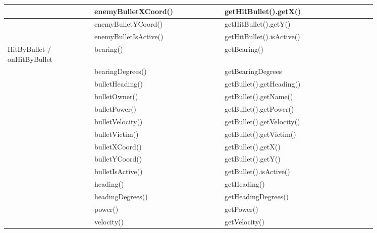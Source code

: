 \begin{center}
\begin{tabular}{ | p{0.2\linewidth} | p{0.3\linewidth} | p{0.35\linewidth} |}
		& enemyBulletXCoord() & getHitBullet().getX() \\ \hline
		& enemyBulletYCoord() & getHitBullet().getY() \\ \hline
		& enemyBulletIsActive() & getHitBullet().isActive() \\ \hline
		HitByBullet / onHitByBullet& bearing() & getBearing() \\ \hline
		& bearingDegrees() & getBearingDegrees \\ \hline
		& bulletHeading() & getBullet().getHeading() \\ \hline
		& bulletOwner() & getBullet().getName() \\ \hline
		& bulletPower() & getBullet().getPower() \\ \hline
		& bulletVelocity() & getBullet().getVelocity() \\ \hline
		& bulletVictim() & getBullet().getVictim() \\ \hline
		& bulletXCoord() & getBullet().getX() \\ \hline
		& bulletYCoord() & getBullet().getY() \\ \hline
		& bulletIsActive() & getBullet().isActive() \\ \hline
		& heading() & getHeading() \\ \hline
		& headingDegrees() & getHeadingDegrees() \\ \hline
		& power() & getPower() \\ \hline
		& velocity() & getVelocity() \\ \hline
	\end{tabular}
	\label{fig:ReservedCallsTable}
\end{center}


